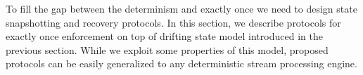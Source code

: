 
\label {fs-consistency-section}

To fill the gap between the determinism and exactly once we need to design state snapshotting and recovery protocols. In this section, we describe protocols for exactly once enforcement on top of drifting state model introduced in the previous section. While we exploit some properties of this model, proposed protocols can be easily generalized to any deterministic stream processing engine.








